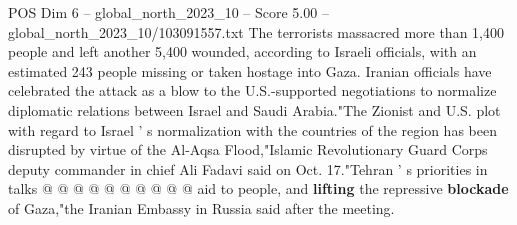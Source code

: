 \begin{textsample}{POS Dim 6 – global\_north\_2023\_10 – Score 5.00 – global\_north\_2023\_10/103091557.txt}
The terrorists massacred more than 1,400 people and left another 5,400 wounded, according to Israeli officials, with an estimated 243 people missing or taken hostage into Gaza.
Iranian officials have celebrated the attack as a blow to the U.S.-supported negotiations to normalize diplomatic relations between Israel and Saudi Arabia."The Zionist and U.S. plot with regard to Israel ' s normalization with the countries of the region has been disrupted by virtue of the Al-Aqsa Flood,"Islamic Revolutionary Guard Corps deputy commander in chief Ali Fadavi said on Oct. 17."Tehran ' s priorities in talks @ @ @ @ @ @ @ @ @ @ aid to people, and \textbf{lifting} the repressive \textbf{blockade} of Gaza,"the Iranian Embassy in Russia said after the meeting.

\end{textsample}
